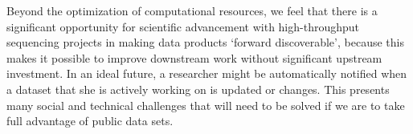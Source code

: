 \documentclass[12pt]{article}
\begin{document}
Beyond the optimization of computational resources, we feel that there
is a significant opportunity for scientific advancement with
high-throughput sequencing projects in making data products `forward
discoverable', because this makes it possible to improve downstream
work without significant upstream investment.  In an ideal future, a
researcher might be automatically notified when a dataset that she is
actively working on is updated or changes. This presents many social
and technical challenges that will need to be solved if we are to take
full advantage of public data sets.




\newpage


\end{document}
